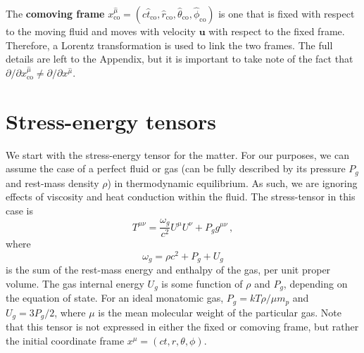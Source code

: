 \documentclass[../main.tex]{subfiles}
\begin{document}
The \textbf{comoving frame} $x^{\hat{\mu}}_\text{co}=(c\hat{t}_\text{co},\hat{r}_\text{co},\hat{\theta}_\text{co},\hat{\phi}_\text{co})$ is one that is fixed with respect to the moving fluid and moves with velocity $\bm{u}$ with respect to the fixed frame.  Therefore, a Lorentz transformation is used to link the two frames.  The full details are left to the Appendix, but it is important to take note of the fact that $\partial/\partial x_\text{co}^{\hat{\mu}}\neq \partial/\partial x^{\hat{\mu}}$. 

\section{Stress-energy tensors}\label{sec:tensors}
We start with the stress-energy tensor for the matter.  For our purposes, we can assume the case of a perfect fluid or gas (can be fully described by its pressure $P_g$ and rest-mass density $\rho$) in thermodynamic equilibrium.  As such, we are ignoring effects of viscosity and heat conduction within the fluid.  The stress-tensor in this case is
\begin{equation}\label{eq:matterstresstensor}
    T^{\mu\nu}=\frac{\omega_g}{c^2}U^\mu U^\nu +P_g g^{\mu\nu}\,,
\end{equation}
where
\begin{equation}\label{eq:omegag}
    \omega_g=\rho c^2+P_g+U_g
\end{equation}
is the sum of the rest-mass energy and enthalpy of the gas, per unit proper volume. The gas internal energy $U_g$ is some function of $\rho$ and $P_g$, depending on the equation of state.  For an ideal monatomic gas, $P_g=kT\rho/\mu m_p$ and $U_g=3P_g/2$, where $\mu$ is the mean molecular weight of the particular gas.  Note that this tensor is not expressed in either the fixed or comoving frame, but rather the initial coordinate frame $x^\mu=(ct,r,\theta,\phi)$. 
\end{document}
